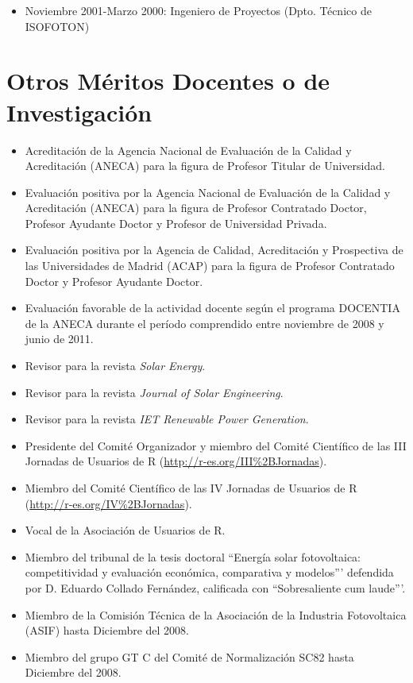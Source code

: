 \documentclass[article, a4paper]{memoir}
\begin{document}
\begin{itemize}
\item Noviembre 2001-Marzo 2000: Ingeniero de Proyectos (Dpto. Técnico
de ISOFOTON)
\end{itemize}



\section{Otros Méritos Docentes o de Investigación}
\label{sec-12}

\begin{itemize}
\item Acreditación de la Agencia Nacional de Evaluación de la Calidad y
Acreditación (ANECA) para la figura de Profesor Titular de
Universidad.

\item Evaluación positiva por la Agencia Nacional de Evaluación de la
Calidad y Acreditación (ANECA) para la figura de Profesor Contratado
Doctor, Profesor Ayudante Doctor y Profesor de Universidad Privada.

\item Evaluación positiva por la Agencia de Calidad, Acreditación y
Prospectiva de las Universidades de Madrid (ACAP) para la figura de
Profesor Contratado Doctor y Profesor Ayudante Doctor.

\item Evaluación favorable de la actividad docente según el programa
DOCENTIA de la ANECA durante el período comprendido entre noviembre
de 2008 y junio de 2011.

\item Revisor para la revista \emph{Solar Energy}.

\item Revisor para la revista \emph{Journal of Solar Engineering}.

\item Revisor para la revista \emph{IET Renewable Power Generation}.

\item Presidente del Comité Organizador y miembro del Comité Científico de
las III Jornadas de Usuarios de R (\url{http://r-es.org/III\%2BJornadas}).

\item Miembro del Comité Científico de las IV Jornadas de Usuarios de
R (\url{http://r-es.org/IV\%2BJornadas}).

\item Vocal de la Asociación de Usuarios de R.

\item Miembro del tribunal de la tesis doctoral ``Energía solar
fotovoltaica: competitividad y evaluación económica,
comparativa y modelos''' defendida por D. Eduardo Collado
Fernández, calificada con ``Sobresaliente cum laude'''.

\item Miembro de la Comisión Técnica de la Asociación de la Industria
Fotovoltaica (ASIF) hasta Diciembre del 2008.

\item Miembro del grupo GT C del Comité de Normalización SC82 hasta
Diciembre del 2008.
\end{itemize}
\end{document}
